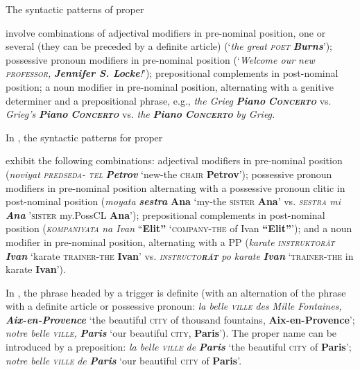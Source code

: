 \documentclass[output=paper]{langsci/langscibook}
\newcommand{\trigger}[1]{\textsc{#1}}
\begin{document}
The syntactic patterns of  proper { involve
combinations of adjectival modifiers in pre-nominal position, one or
several (they can be preceded by a definite article) (‘\textit{the
great }\textit{\trigger{poet}} \textbf{\textit{Burns}}’); possessive
pronoun modifiers in pre-nominal position (‘\textit{Welcome our new
}\textit{\trigger{professor}}\textit{, }\textbf{\textit{Jennifer S.
Locke}}\textit{!}’); prepositional complements in post-nominal
position; a noun modifier in pre-nominal position, alternating with a
genitive determiner and a prepositional phrase, e.g., \textit{the Grieg
}\textbf{\textit{Piano }}\textbf{\textit{\trigger{Concerto}}} vs.
\textit{Grieg’s }\textbf{\textit{Piano
}}\textbf{\textit{\trigger{Concerto}}} vs. \textit{the
}\textbf{\textit{Piano }}\textbf{\textit{\trigger{Concerto}}} \textit{by
Grieg.}



In , the syntactic patterns for proper { exhibit
the following combinations: adjectival modifiers in pre-nominal
position (\textit{noviyat }\textit{\trigger{predseda-}} \textit{\trigger{tel}} \textbf{\textit{Petrov}} `new-the \trigger{chair}\textbf{ Petrov}');
possessive pronoun modifiers in pre-nominal position alternating with a
possessive pronoun clitic in post-nominal position (\textit{moyata
}\textbf{\textit{sestra}} \textbf{Ana} `my-the \trigger{sister}\textbf{
Ana}' vs. \textit{\trigger{sestra}}\textit{ mi }\textbf{\textit{Ana}}
'\trigger{sister} my.PossCL \textbf{Ana}'); prepositional complements in
post-nominal position (\textit{\trigger{kompaniyata}}\textit{ na Ivan}
“\textbf{Elit”} `\trigger{company}-\trigger{the} of Ivan \textbf{“Elit”}');
and a noun modifier in pre-nominal position, alternating with a PP
(\textit{karate }\textit{\trigger{instruktorăt}}\textbf{\textit{ Ivan}}
`karate \trigger{trainer-the}\textbf{ Ivan}' vs.
\textit{\trigger{instructo}}\textbf{\textit{\trigger{răt}}}\textbf{\textit{
}}\textit{po karate }\textbf{\textit{Ivan}} `\trigger{trainer-the} in
karate \textbf{Ivan}').



In , the phrase headed by a trigger is definite (with an
alternation of the phrase with a definite article or possessive
pronoun: \textit{la belle }\textit{\trigger{ville}} \textit{des Mille
Fontaines, }\textbf{\textit{Aix-en-Provence}} ‘the beautiful
\trigger{city} of thousand fountains, \textbf{Aix-en-Provence}’;
\textit{notre belle }\textit{\trigger{ville}}\textit{,}
\textbf{\textit{Paris}} ‘our beautiful \trigger{city}, \textbf{Paris}’).
The proper name can be introduced by a preposition: \textit{la belle
}\textit{\trigger{ville}} \textit{de }\textbf{\textit{Paris}} ‘the
beautiful \trigger{city} of \textbf{Paris}’; \textit{notre belle
}\textit{\trigger{ville}} \textit{de }\textbf{\textit{Paris}} ‘our
beautiful \trigger{city} of \textbf{Paris}’.



}}
\end{document}
